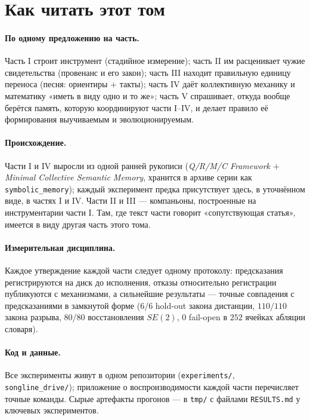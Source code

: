 \section*{Как читать этот том}

\paragraph{По одному предложению на часть.} Часть I строит инструмент
(стадийное измерение); часть II им расценивает чужие свидетельства
(провенанс и его закон); часть III находит правильную единицу
переноса (песня: ориентиры $+$ такты); часть IV даёт коллективную
механику и математику «иметь в виду одно и то же»; часть V
спрашивает, откуда вообще берётся память, которую координируют части
I--IV, и делает правило её формирования выучиваемым и
эволюционируемым.

\paragraph{Происхождение.} Части I и IV выросли из одной ранней
рукописи (\emph{Q/R/M/C Framework $+$ Minimal Collective Semantic
Memory}, хранится в архиве серии как \texttt{symbolic\_memory});
каждый эксперимент предка присутствует здесь, в уточнённом виде, в
частях I и IV. Части II и III --- компаньоны, построенные на
инструментарии части I. Там, где текст части говорит
«сопутствующая статья», имеется в виду другая часть этого тома.

\paragraph{Измерительная дисциплина.} Каждое утверждение каждой части
следует одному протоколу: предсказания регистрируются на диск до
исполнения, отказы относительно регистрации публикуются с
механизмами, а сильнейшие результаты --- точные совпадения с
предсказаниями в замкнутой форме ($6/6$ hold-out закона дистанции,
$110/110$ закона разрыва, $80/80$ восстановления $SE(2)$, $0$
fail-open в $252$ ячейках абляции словаря).

\paragraph{Код и данные.} Все эксперименты живут в одном репозитории
(\texttt{experiments/}, \texttt{songline\_drive/}); приложение о
воспроизводимости каждой части перечисляет точные команды. Сырые
артефакты прогонов --- в \texttt{tmp/} с файлами \texttt{RESULTS.md}
у ключевых экспериментов.
